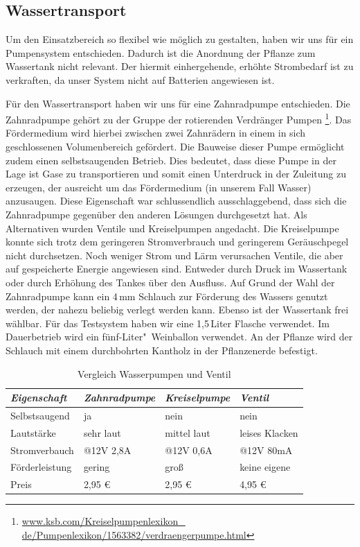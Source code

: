 \subsection{Wassertransport}
Um den Einsatzbereich so flexibel wie möglich zu gestalten, haben wir uns für ein Pumpensystem entschieden. 
Dadurch ist die Anordnung der Pflanze zum Wassertank nicht relevant. 
Der hiermit einhergehende, erhöhte Strombedarf ist zu verkraften, da unser System nicht auf Batterien angewiesen ist.

Für den Wassertransport haben wir uns für eine Zahnradpumpe entschieden.
Die Zahnradpumpe gehört zu der Gruppe der rotierenden Verdränger Pumpen 
\footnote{\href{http://www.ksb.com/Kreiselpumpenlexikon\_de/Pumpenlexikon/1563382/verdraengerpumpe.html}{www.ksb.com/Kreiselpumpenlexikon\_ \\ de/Pumpenlexikon/1563382/verdraengerpumpe.html}}.
Das Fördermedium wird hierbei zwischen zwei Zahnrädern in einem in sich geschlossenen Volumenbereich gefördert.
Die Bauweise dieser Pumpe ermöglicht zudem einen selbstsaugenden Betrieb. 
Dies bedeutet, dass diese Pumpe in der Lage ist Gase zu transportieren und somit einen Unterdruck in der Zuleitung zu erzeugen, der ausreicht um das Fördermedium (in unserem Fall Wasser) anzusaugen. 
Diese Eigenschaft war schlussendlich ausschlaggebend, dass sich die Zahnradpumpe gegenüber den anderen Lösungen durchgesetzt hat.
Als Alternativen wurden Ventile und Kreiselpumpen angedacht.
Die Kreiselpumpe konnte sich trotz dem geringeren Stromverbrauch und geringerem Geräuschpegel nicht durchsetzen. 
Noch weniger Strom und Lärm verursachen Ventile, die aber auf gespeicherte Energie angewiesen sind.  
Entweder durch Druck im Wassertank oder durch Erhöhung des Tankes über den Ausfluss. 
Auf Grund der Wahl der Zahnradpumpe kann ein 4\,mm Schlauch zur Förderung des Wassers genutzt werden, der nahezu beliebig verlegt werden kann.  
Ebenso ist der Wassertank frei wählbar. Für das Testsystem haben wir eine 1,5\,Liter Flasche verwendet. Im Dauerbetrieb wird ein fünf-Liter"~Weinballon verwendet. 
An der Pflanze wird der Schlauch mit einem durchbohrten Kantholz in der Pflanzenerde befestigt.

	
\begin{table}
	\centering
		\onehalfspacing
	\footnotesize
	\caption{Vergleich Wasserpumpen und Ventil}
	\label{Vergleich zwischen Wasserpumpen und Ventil}
		\begin{tabular}{|l|lll|}
		\hline
		\textit{Eigenschaft} & \textit{Zahnradpumpe} & \textit{Kreiselpumpe} & \textit{Ventil} \\
		\hline
		Selbstsaugend	&ja	&nein &nein\\		
		Lautstärke		&sehr laut	&mittel laut	&leises Klacken\\
		Stromverbauch	&@12V 2,8A	&@12V 0,6A	&@12V 80mA\\
		Förderleistung	&gering		&groß		&keine eigene\\
		Preis			&2,95 \euro	& 2,95 \euro	&	4,95 \euro\\
		\hline		
		\end{tabular}
		
\end{table}	
	
